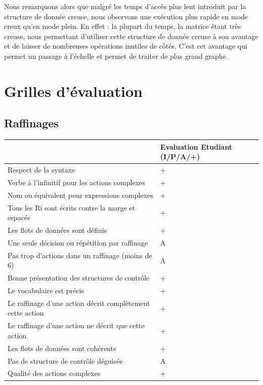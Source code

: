\documentclass{NewTeX}
\begin{document}
Nous remarquons alors que malgré les temps d'accès plus lent introduit par la structure de donnée creuse, nous observons une exécution plus rapide en mode creux qu'en mode plein. En effet : la plupart du temps, la matrice étant très creuse, nous permettant d'utiliser cette structure de donnée creuse à son avantage et de laisser de nombreuses opérations inutiles de côtés. C'est cet avantage qui permet un passage à l'échelle et permet de traiter de plus grand graphe.

\section{Grilles d'évaluation}

\subsection{Raffinages}

\begin{table}[!ht]
    \centering
    \begin{tabular}{|l|l|}
    \hline
        ~ & Evaluation Etudiant (I/P/A/+) \\ \hline
        Respect de la syntaxe & + \\ \hline
        Verbe à l'infinitif pour les actions complexes & + \\ \hline
        Nom ou équivalent pour expressions complexes & + \\ \hline
        Tous les Ri sont écrits contre la marge et espacés & + \\ \hline
        Les flots de données sont définis & + \\ \hline
        Une seule décision ou répétition par raffinage & A \\ \hline
        Pas trop d'actions dans un raffinage (moins de 6) & A \\ \hline
        Bonne présentation des structures de contrôle & + \\ \hline
        Le vocabulaire est précis & + \\ \hline
        Le raffinage d'une action décrit complètement cette action & + \\ \hline
        Le raffinage d'une action ne décrit que cette action & + \\ \hline
        Les flots de données sont cohérents & + \\ \hline
        Pas de structure de contrôle déguisée & A \\ \hline
        Qualité des actions complexes & + \\ \hline
    \end{tabular}
\end{table}
\end{document}
